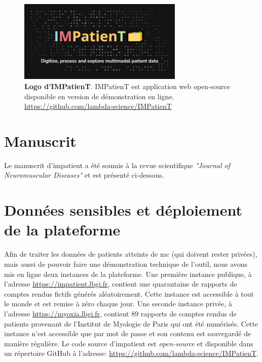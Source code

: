 \begin{figure}[H]
  \centering
  \includegraphics[width=0.7\textwidth]{figures/impatient_banner.png}
  \caption[Logo IMPatienT]{\textbf{Logo d’IMPatienT}. IMPatienT est application web open-source disponible en version de démonstration en ligne. \url{https://github.com/lambda-science/IMPatienT}}
  \label{fig:impatient_logo}
\end{figure}


\section{Manuscrit} 
Le manuscrit d'\gls{impatient} a été soumis à la revue scientifique \textit{"Journal of Neuromuscular Diseases"} et est présenté ci-dessous.




\section{Données sensibles et déploiement de la plateforme}
Afin de traiter les données de patients atteints de \gls{mc} (qui doivent rester privées), mais aussi de pouvoir faire une démonstration technique de l'outil, nous avons mis en ligne deux instances de la plateforme. Une première instance publique, à l'adresse \url{https://impatient.lbgi.fr}, contient une quarantaine de rapports de comptes rendus fictifs générés aléatoirement. Cette instance est accessible à tout le monde et est remise à zéro chaque jour. Une seconde instance privée, à l'adresse \url{https://myoxia.lbgi.fr}, contient 89 rapports de comptes rendus de patients provenant de l'Institut de Myologie de Paris qui ont été numérisés. Cette instance n'est accessible que par mot de passe et son contenu est sauvegardé de manière régulière. Le code source d'\gls{impatient} est \textit{open-source} et disponible dans un répertoire GitHub à l'adresse: \url{https://github.com/lambda-science/IMPatienT}.


